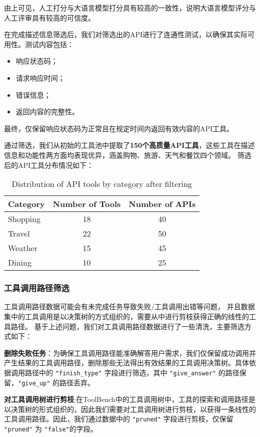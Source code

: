 由上可见，人工打分与大语言模型打分具有较高的一致性，说明大语言模型评分与人工评审具有较高的可信度。


在完成描述信息筛选后，我们对筛选出的API进行了连通性测试，以确保其实际可用性。测试内容包括：
\begin{itemize}
    \item 响应状态码；
    \item 请求响应时间；
    \item 错误信息；
    \item 返回内容的完整性。
\end{itemize}

最终，仅保留响应状态码为正常且在规定时间内返回有效内容的API工具。

通过筛选，我们从初始的工具池中提取了\textbf{150个高质量API工具}，这些工具在描述信息和功能性两方面均表现优异，涵盖购物、旅游、天气和餐饮四个领域。
筛选后的API工具分布情况如下：

\begin{table}[h]
  \centering
  \caption{Distribution of API tools by category after filtering}
  \label{tab:api_distribution}
  \begin{tabular}{l|c|c}
  \toprule
  \textbf{Category} & \textbf{Number of Tools} & \textbf{Number of APIs} \\ \midrule
  Shopping & 18 & 40 \\ \hline
  Travel   & 22 & 50 \\ \hline
  Weather  & 15 & 45 \\ \hline
  Dining   & 10 & 25 \\ 
  \bottomrule
  \end{tabular}
  \end{table}

\subsubsection{工具调用路径筛选}

工具调用路径数据可能会有未完成任务导致失败/工具调用出错等问题，
并且数据集中的工具调用是以决策树的方式组织的，需要从中进行剪枝获得正确的线性的工具路径。
基于上述问题，我们对工具调用路径数据进行了一些清洗，主要筛选方式如下：

\textbf{删除失败任务}：为确保工具调用路径能准确解答用户需求，我们仅保留成功调用并产生结果的工具调用路径，删除那些无法得出有效结果的工具调用决策树。具体依据调用路径中的 \texttt{"finish\_type"} 字段进行筛选，其中 \texttt{"give\_answer"} 的路径保留，\texttt{"give\_up"} 的路径丢弃。

\textbf{对工具调用树进行剪枝}:在ToolBench中的工具调用树中，工具的探索和调用路径是以决策树的形式组织的，因此我们需要对工具调用树进行剪枝，以获得一条线性的工具调用路径。因此，我们通过数据中的 \texttt{"pruned"} 字段进行剪枝，仅保留 \texttt{"pruned"} 为 \texttt{"false"}的字段。

